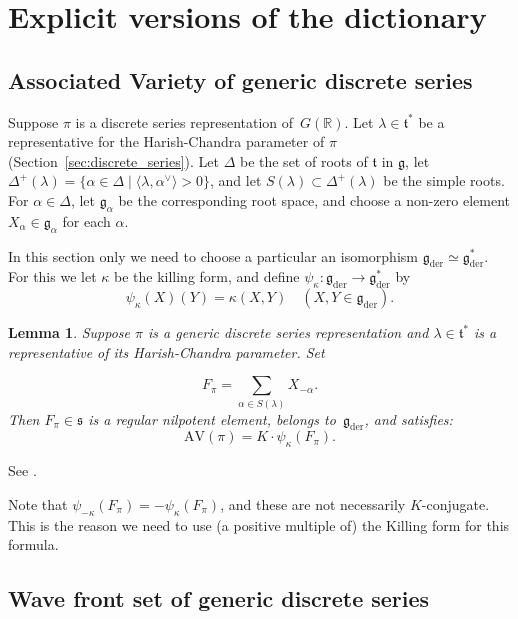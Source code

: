 \documentclass[10pt,leqno]{article}
\newtheorem{lemma}[equation]{Lemma}
\numberwithin{equation}{section}
\newcommand{\R}{\mathbb R}
\newcommand{\ch}[1]{#1^\vee}
\renewcommand{\t}{\mathfrak t}
\newcommand{\g}{\mathfrak g}
\newcommand{\gder}{\mathfrak g_{\mathrm{der}}}
\newcommand{\s}{\mathfrak s}
\newcommand{\AV}{\mathrm{AV}}
\begin{document}
\section{Explicit versions of the dictionary}\label{sec:explicit}

\subsection{Associated Variety of generic discrete series}
\label{s:AV}

Suppose $\pi$ is a  discrete series representation of~$G(\R)$. Let
$\lambda\in\t^*$ be a representative for the Harish-Chandra parameter of $\pi$ (Section~\ref{sec:discrete_series}). Let $\Delta$ be the set of roots of $\t$ in $\g$, 
let $\Delta^+(\lambda)=\{\alpha \in \Delta \mid \langle\lambda,\ch\alpha\rangle>0\}$,
and let $S(\lambda)\subset\Delta^+(\lambda)$ be the simple roots.
For $\alpha\in \Delta$, let $\g_\alpha$ be the corresponding root space, and choose a non-zero element $X_\alpha\in\g_\alpha$ for each $\alpha$.

In this section only we need to  choose a particular an isomorphism \mbox{$\gder\simeq \gder^*$}.
For this we let $\kappa$ be the killing form, and define $\psi_\kappa:\gder\rightarrow \gder^*$ by
$$
\psi_\kappa(X)(Y)=\kappa(X,Y)\quad (X,Y\in \gder).
$$

\begin{lemma}
\label{l:pi_to_av}
  \label{l:AV}
Suppose $\pi$ is a generic discrete series representation and $\lambda\in\t^*$ is a representative of its  Harish-Chandra parameter.
Set

\begin{equation}
  \label{e:Fpi}
  F_\pi=\sum_{\alpha\in S(\lambda)}X_{-\alpha}.
\end{equation}
Then $F_\pi\in\s$ is a regular nilpotent element, belongs to~$\gder$, and satisfies: 
$$
\AV(\pi)=K\cdot \psi_\kappa(F_\pi).
$$
\end{lemma}
See
\cite[Propositions A.7 and A.9]{AV1}.

\begin{remarkplain}
Note that $\psi_{-\kappa}(F_\pi)=-\psi_{\kappa}(F_\pi)$, and these are not necessarily $K$-conjugate.
  This is the reason we need to use (a positive multiple of) the Killing form for this formula.
\end{remarkplain}

\subsection{Wave front set of generic discrete series}\label{sec:asymp_cone}
\end{document}
